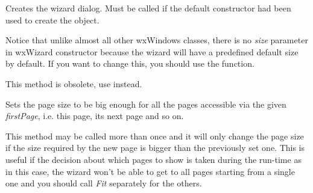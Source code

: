 



\label{wxwizardcreate}


Creates the wizard dialog. Must be called if the default constructor had been
used to create the object.

Notice that unlike almost all other wxWindows classes, there is no {\it size} 
parameter in wxWizard constructor because the wizard will have a predefined
default size by default. If you want to change this, you should use the 
 function.









\label{wxwizardfittopage}


This method is obsolete, use
 instead.

Sets the page size to be big enough for all the pages accessible via the
given {\it firstPage}, i.e. this page, its next page and so on.

This method may be called more than once and it will only change the page size
if the size required by the new page is bigger than the previously set one.
This is useful if the decision about which pages to show is taken during the
run-time as in this case, the wizard won't be able to get to all pages starting
from a single one and you should call {\it Fit} separately for the others.


